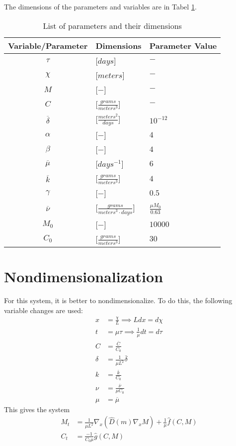   
  
  
  The dimensions of the parameters and variables are in Tabel \ref{tab:varDimensions}.
  
  \begin{table}[!hbt]
    \centering
    \begin{tabular}{|c | l | l|}
      \hline 
      Variable/Parameter & Dimensions & Parameter Value\\
      \hline 
      $\tau$ & [$days$] & $-$ \\
      $\chi$ & [$meters$] & $-$ \\
      $ M  $ & [$-$] & $-$\\
      $ C  $ & [$\frac{grams}{meters^3}$]  & $-$\\
      $ \overline{\delta} $ & [$\frac{meters^2}{days}$] & $10^{-12}$ \\
      $ \alpha $ & [$-$] & $4$\\
      $ \beta  $ & [$-$] & $4$\\
      $ \overline{\mu}$ & [$days^{-1} $] & $6$ \\
      $ \overline{k}  $ & [$\frac{grams}{meters^3}$] & $4$ \\
      $ \gamma $ & [$-$] & $0.5$\\
      $ \overline{\nu}$ & [$\frac{grams}{meters^3 \cdot days}$] & $\frac{\mu M_0}{0.63}$ \\
      $ M_0 $ & [$-$] & $10000$ \\
      $ C_0 $ & [$\frac{grams}{meters^3}$]  & $30$ \\
      \hline
    \end{tabular}
    \caption{List of parameters and their dimensions}
        \label{tab:varDimensions}
  \end{table}
  
\section {Nondimensionalization}
  For this system, it is better to nondimensionalize. To do this, the following variable changes are used:
  \begin{align}
    x &= \frac{\chi}{L} \implies L dx = d\chi\\
    t &= \mu \tau \implies \frac{1}{\mu} dt= d\tau\\
    C &= \frac{\overline{C}}{C_0} \\
    \delta &= \frac{1}{\mu L^2} \overline{\delta} \\
    k &= \frac{\overline{k}}{C_0} \\
    \nu &= \frac{\overline{\nu}}{\mu C_0} \\
    \mu &= \overline{\mu}
  \end{align}
  This gives the system
  \begin{align}
    M_t &= \frac{1}{\mu L^2} \nabla_x \left(\hat{D}(m) \nabla_x M \right) + \frac{1}{\mu} \hat{f}(C,M) \\
    C_t &= \frac{ -1}{C_0 \mu} \hat{g}(C,M)
  \end{align}
  
